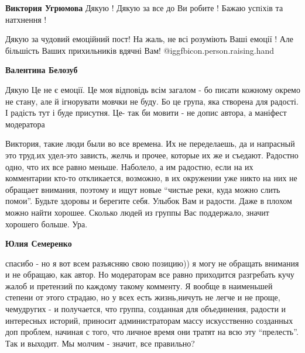 \begin{itemize}
\begin{itemize}
\textbf{Виктория Угрюмова}
Дякую ! Дякую за все до Ви робите ! Бажаю успiхiв та натхнення !
\end{itemize} %


Дякую за чудовий емоційний пост! На жаль, не всі розуміють Ваші емоції ! Але
більшість Ваших прихильників вдячні Вам! @igg{fbicon.person.raising.hand} 

\begin{itemize} %
\textbf{Валентина Белозуб} 

Дякую Це не є емоції. Це моя відповідь всім загалом - бо писати кожному окремо
не стану, але й ігнорувати мовчки не буду. Бо це група, яка створена для
радості. І радість тут і буде присутня. Це- так би мовити - не допис автора, а
маніфест модератора

\end{itemize} %



Виктория, такие люди были во все времена. Их не переделаешь, да и напрасный это
труд.их удел-это зависть, желчь и прочее, которые их же и съедают. Радостно
одно, что их все равно меньше. Наболело, а им радостно, если на их комментарии
кто-то откликается, возможно, в их окружении уже никто на них не обращает
внимания, поэтому и ищут новые \enquote{чистые реки, куда можно слить помои}. Будьте
здоровы и берегите себя. Улыбок Вам и радости. Даже в плохом можно найти
хорошее. Сколько людей из группы Вас поддержало, значит хорошего больше. Ура.

\begin{itemize} %
\textbf{Юлия Семеренко} 

спасибо - но я вот всем разъясняю свою позицию)) я могу не обращать внимания и
не обращаю, как автор. Но модераторам все равно приходится разгребать кучу
жалоб и претензий по каждому такому комменту. Я вообще в наименьшей степени от
этого страдаю, но у всех есть жизнь,ничуть не легче и не проще, чемудругих - и
получается, что группа, созданная для объединения, радости и интересных
историй, приносит администраторам массу искусственно созданных доп проблем,
начиная с того, что личное время они тратят на всю эту \enquote{прелесть}. Так и
выходит. Мы молчим - значит, все правильно?

\end{itemize} %



\end{itemize}
